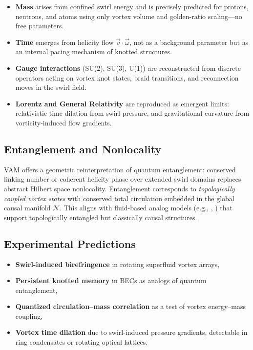 \begin{itemize}
  \item \textbf{Mass} arises from confined swirl energy and is precisely predicted for protons, neutrons, and atoms using only vortex volume and golden-ratio scaling—no free parameters.
  \item \textbf{Time} emerges from helicity flow \( \vec{v} \cdot \vec{\omega} \), not as a background parameter but as an internal pacing mechanism of knotted structures.
  \item \textbf{Gauge interactions} (SU(2), SU(3), U(1)) are reconstructed from discrete operators acting on vortex knot states, braid transitions, and reconnection moves in the swirl field.
  \item \textbf{Lorentz and General Relativity} are reproduced as emergent limits: relativistic time dilation from swirl pressure, and gravitational curvature from vorticity-induced flow gradients.
\end{itemize}

\subsection*{Entanglement and Nonlocality}

VAM offers a geometric reinterpretation of quantum entanglement: conserved linking number or coherent helicity phase over extended swirl domains replaces abstract Hilbert space nonlocality. Entanglement corresponds to \emph{topologically coupled vortex states} with conserved total circulation embedded in the global causal manifold \( \mathcal{N} \). This aligns with fluid-based analog models (e.g., \cite{volovik2003universe}, \cite{kiehn2005topological}) that support topologically entangled but classically causal structures.


\subsection*{Experimental Predictions}

\begin{itemize}
  \item \textbf{Swirl-induced birefringence} in rotating superfluid vortex arrays,
  \item \textbf{Persistent knotted memory} in BECs as analogs of quantum entanglement,
  \item \textbf{Quantized circulation–mass correlation} as a test of vortex energy–mass coupling,
  \item \textbf{Vortex time dilation} due to swirl-induced pressure gradients, detectable in ring condensates or rotating optical lattices.
\end{itemize}

